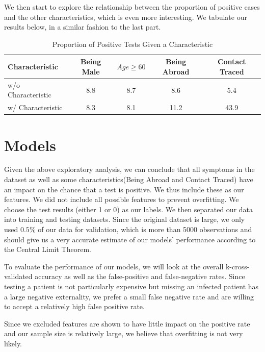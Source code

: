 \documentclass[a4paper]{article}
\begin{document}
We then start to explore the relationship between the proportion of positive cases and the other characteristics, which is even more interesting. We tabulate our results below, in a similar fashion to the last part.
\begin{table}[H]
\centering
\caption{Proportion of Positive Tests Given a Characteristic}
\begin{tabular}{| l | c | c | c | c |}
\hline
Characteristic & Being Male & $Age \ge 60$ & Being Abroad & Contact Traced  \\ \hline
w/o Characteristic & 8.8 & 8.7 & 8.6 & 5.4 \\ \hline
w/ Characteristic & 8.3 & 8.1 & 11.2 & 43.9 \\
\hline
\end{tabular}
\label{Table}
\end{table}

\section*{Models}
Given the above exploratory analysis, we can conclude that all symptoms in the dataset as well as some characteristics(Being Abroad and Contact Traced) have an impact on the chance that a test is positive. We thus include these as our features. We did not include all possible features to prevent overfitting. We choose the test results (either 1 or 0) as our labels. We then separated our data into training and testing datasets. Since the original dataset is large, we only used $0.5\%$ of our data for validation, which is more than 5000 observations and should give us a very accurate estimate of our models' performance according to the Central Limit Theorem. \par
To evaluate the performance of our models, we will look at the overall k-cross-validated accuracy as well as the false-positive and false-negative rates. Since testing a patient is not particularly expensive but missing an infected patient has a large negative externality, we prefer a small false negative rate and are willing to accept a relatively high false positive rate. \par
Since we excluded features are shown to have little impact on the positive rate and our sample size is relatively large, we believe that overfitting is not very likely.
\end{document}
